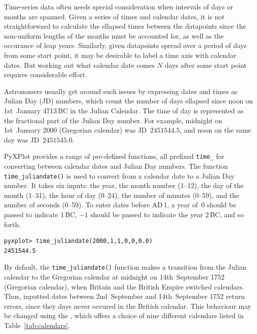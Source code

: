 Time-series data often needs special consideration when intervals of days or
months are spanned. Given a series of times and calendar dates, it is not
straightforward to calculate the ellapsed times between the datapoints since
the non-uniform lengths of the months must be accounted for, as well as the
occurance of leap years. Similarly, given datapoints spread over a period of
days from some start point, it may be desirable to label a time axis with
calendar dates. But working out what calendar date comes $N$ days after some
start point requires considerable effort.

Astronomers usually get around such issues by expressing dates and times as
Julian Day (JD) numbers, which count the number of
days ellapsed since noon on 1st~January 4713\,{\footnotesize BC} in the Julian
Calendar. The time of day is represented as the fractional part of the Julian
Day number. For example, midnight on 1st~January 2000 (Gregorian calendar) was
JD~$2451544.5$, and noon on the same day was JD~$2451545.0$.

PyXPlot provides a range of pre-defined functions, all prefixed {\tt time\_}
for converting between calendar dates and Julian Day numbers. The function {\tt
time\_juliandate()} is used to convert from a calendar
date to a Julian Day number. It takes six inputs: the year, the month number
(1--12), the day of the month (1--31), the hour of day (0--24), the number of
minutes (0--59), and the number of seconds (0--59). To enter dates before
{\footnotesize AD}\,1, a year of~$0$ should be passed to indicate
1\,{\footnotesize BC}, $-1$ should be passed to indicate the year
2\,{\footnotesize BC}, and so forth.
\begin{verbatim}
pyxplot> time_juliandate(2000,1,1,0,0,0.0)
2451544.5
\end{verbatim}

By default, the {\tt time\_juliandate()} function makes a transition from the
Julian calendar to the Gregorian calendar at midnight on 14th~September 1752
(Gregorian calendar), when Britain and the British Empire switched calendars.
Thus, inputted dates between 2nd~September and 14th~September 1752 return
errors, since they days never occured in the British calendar. This behaviour
may be changed using the , which offers a choice of nine
different calendars listed in Table~\ref{tab:calendars}.


